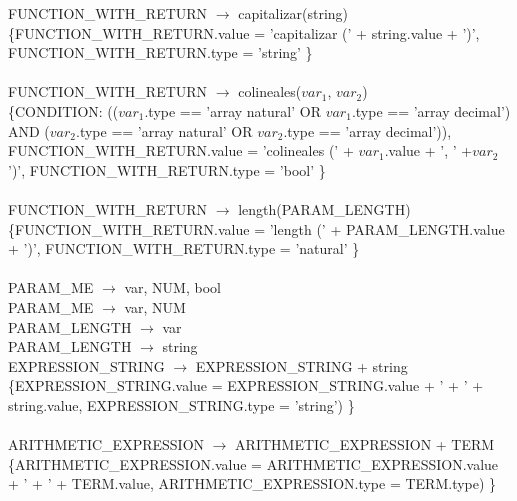 \documentclass[10pt,a4paper]{article}
\begin{document}
{{{FUNCTION\_WITH\_RETURN $\rightarrow$ capitalizar(string)   \\

\{FUNCTION\_WITH\_RETURN.value =  'capitalizar (' + string.value + ')', FUNCTION\_WITH\_RETURN.type = 'string'  \}  \\ \\


FUNCTION\_WITH\_RETURN $\rightarrow$ colineales($var_{1}$, $var_{2}$)   \\

\{CONDITION: (($var_{1}$.type == 'array natural' OR $ var_{1}$.type == 'array decimal') AND
($var_{2}$.type == 'array natural' OR $var_{2}$.type == 'array decimal')), FUNCTION\_WITH\_RETURN.value =  'colineales (' + $var_{1}$.value + ', ' +$var_{2}$')', FUNCTION\_WITH\_RETURN.type = 'bool'  \}  \\ \\


FUNCTION\_WITH\_RETURN $\rightarrow$ length(PARAM\_LENGTH) \\

\{FUNCTION\_WITH\_RETURN.value =  'length (' + PARAM\_LENGTH.value + ')', FUNCTION\_WITH\_RETURN.type = 'natural'  \}  \\ \\



PARAM\_ME $\rightarrow$ var, NUM, bool   \\

PARAM\_ME $\rightarrow$ var, NUM \\

PARAM\_LENGTH $\rightarrow$ var    \\

PARAM\_LENGTH $\rightarrow$ string \\


EXPRESSION\_STRING $\rightarrow$ EXPRESSION\_STRING + string \\  

\{EXPRESSION\_STRING.value =  EXPRESSION\_STRING.value + ' + ' + string.value, EXPRESSION\_STRING.type = 'string') \}  \\ \\


ARITHMETIC\_EXPRESSION $\rightarrow$ ARITHMETIC\_EXPRESSION + TERM   \\

\{ARITHMETIC\_EXPRESSION.value =  ARITHMETIC\_EXPRESSION.value + ' + ' + TERM.value, ARITHMETIC\_EXPRESSION.type = TERM.type) \}  \\ \\


}}}
\end{document}
